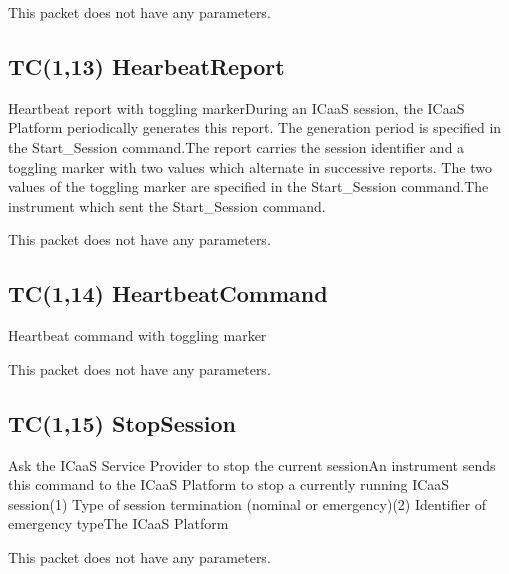This packet does not have any parameters.

\pagebreak
\subsection{TC(1,13) HearbeatReport}
Heartbeat report with toggling markerDuring an ICaaS session, the ICaaS Platform periodically generates this report. The generation period is specified in the Start\_\-Session command.The report carries the session identifier and a toggling marker with two values which alternate in successive reports. The two values of the toggling marker are specified in the Start\_\-Session command.The instrument which sent the Start\_\-Session command.

This packet does not have any parameters.

\pagebreak
\subsection{TC(1,14) HeartbeatCommand}
Heartbeat command with toggling marker

This packet does not have any parameters.

\pagebreak
\subsection{TC(1,15) StopSession}
Ask the ICaaS Service Provider  to stop the current sessionAn instrument sends this command to the ICaaS Platform to stop a currently running ICaaS session(1) Type of session termination (nominal or emergency)\newline (2) Identifier of emergency typeThe ICaaS Platform

This packet does not have any parameters.

